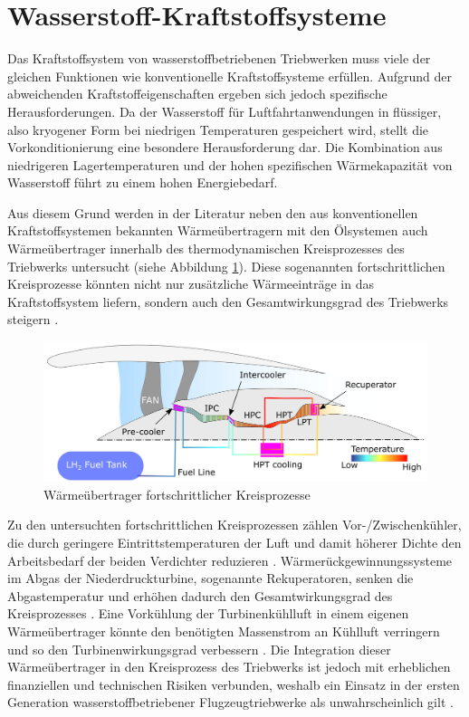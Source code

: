 \section{Wasserstoff-Kraftstoffsysteme}

Das Kraftstoffsystem von wasserstoffbetriebenen Triebwerken muss viele der gleichen Funktionen wie konventionelle Kraftstoffsysteme erfüllen. Aufgrund der abweichenden Kraftstoffeigenschaften ergeben sich jedoch spezifische Herausforderungen. Da der Wasserstoff für Luftfahrtanwendungen in flüssiger, also kryogener Form bei niedrigen Temperaturen gespeichert wird, stellt die Vorkonditionierung eine besondere Herausforderung dar. Die Kombination aus niedrigeren Lagertemperaturen und der hohen spezifischen Wärmekapazität von Wasserstoff führt zu einem hohen Energiebedarf. \cite{Rompokos.2024, Sethi.2022}

Aus diesem Grund werden in der Literatur neben den aus konventionellen Kraftstoffsystemen bekannten Wärmeübertragern mit den Ölsystemen auch Wärmeübertrager innerhalb des thermodynamischen Kreisprozesses des Triebwerks untersucht (siehe Abbildung \ref{fig:2.2}). Diese sogenannten fortschrittlichen Kreisprozesse könnten nicht nur zusätzliche Wärmeeinträge in das Kraftstoffsystem liefern, sondern auch den Gesamtwirkungsgrad des Triebwerks steigern \cite{Tacconi.2023}.

\begin{figure}[ht]
\centering
\includegraphics[width=0.75\linewidth]{4_Abbildungen/2_Hauptteil/Advanced Cycles.png}
  \caption{Wärmeübertrager fortschrittlicher Kreisprozesse \cite{Sethi.2022}}
  \label{fig:2.2}
\end{figure}
\FloatBarrier 

Zu den untersuchten fortschrittlichen Kreisprozessen zählen Vor-/Zwischenkühler, die durch geringere Eintrittstemperaturen der Luft und damit höherer Dichte den Arbeitsbedarf der beiden Verdichter reduzieren \cite{Abedi.2022}. Wärmerückgewinnungssysteme im Abgas der Niederdruckturbine, sogenannte Rekuperatoren, senken die Abgastemperatur und erhöhen dadurch den Gesamtwirkungsgrad des Kreisprozesses \cite{Brewer.1991}. Eine Vorkühlung der Turbinenkühlluft in einem eigenen Wärmeübertrager könnte den benötigten Massenstrom an Kühlluft verringern und so den Turbinenwirkungsgrad verbessern \cite{Brewer.1991}. Die Integration dieser Wärmeübertrager in den Kreisprozess des Triebwerks ist jedoch mit erheblichen finanziellen und technischen Risiken verbunden, weshalb ein Einsatz in der ersten Generation wasserstoffbetriebener Flugzeugtriebwerke als unwahrscheinlich gilt \cite{Rompokos.2024, Huete.2021}. 

